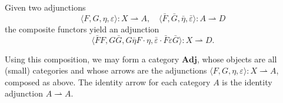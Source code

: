 Given two adjunctions
$$\langle F, G, \eta, \varepsilon \rangle : X \rightharpoonup A, \quad \langle \bar{F}, \bar{G}, \bar{\eta}, \bar{\varepsilon} \rangle : A \rightharpoonup D$$
the composite functors yield an adjunction
$$\langle \bar{F}F, G\bar{G}, G\bar{\eta}F \cdot \eta, \bar{\varepsilon} \cdot \bar{F}\varepsilon\bar{G} \rangle : X \rightharpoonup D.$$

Using this composition, we may form a category $\mathbf{Adj}$, whose objects are all (small) categories and whose arrows are the adjunctions $\langle F, G, \eta, \varepsilon \rangle : X \rightharpoonup A$, composed as above. The identity arrow for each category $A$ is the identity adjunction $A \rightharpoonup A$.
